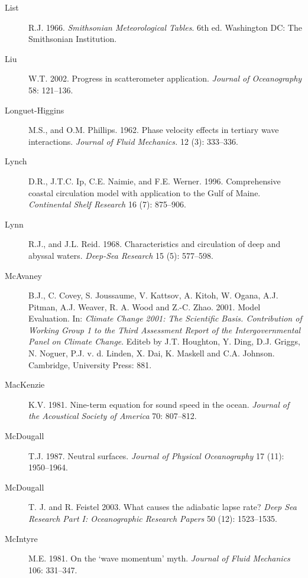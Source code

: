 \begin{description}
\item [List]R.J. 1966. \textit{Smithsonian Meteorological Tables}. 6th
  ed. Washington DC: The Smithsonian Institution.

\item [Liu]W.T. 2002. Progress in scatterometer
  application. \textit{Journal of Oceanography} 58: 121--136.

\item [Longuet-Higgins]M.S., and O.M. Phillips. 1962. Phase velocity
  effects in tertiary wave interactions. \textit{Journal of Fluid
    Mechanics.} 12 (3): 333--336.

\item [Lynch]D.R., J.T.C. Ip, C.E. Naimie, and
  F.E. Werner. 1996. Comprehensive coastal circulation model with
  application to the Gulf of Maine.  \textit{Continental Shelf
    Research} 16 (7): 875--906.

\item [Lynn]R.J., and J.L. Reid. 1968. Characteristics and circulation
  of deep and abyssal waters. \textit{Deep-Sea Research} 15 (5):
  577--598.

\item [McAvaney]B.J., C. Covey, S. Joussaume, V. Kattsov, A. Kitoh,
  W. Ogana, A.J. Pitman, A.J. Weaver, R. A. Wood and
  Z.-C. Zhao. 2001. Model Evaluation. In: \textit{Climate Change 2001:
    The Scientific Basis. Contribution of Working Group 1 to the Third
    Assessment Report of the Intergovernmental Panel on Climate
    Change}.  Editeb by J.T. Houghton, Y. Ding, D.J. Griggs,
  N. Noguer, P.J. v. d. Linden, X.  Dai, K. Maskell and
  C.A. Johnson. Cambridge, University Press: 881.

\item [MacKenzie]K.V. 1981. Nine-term equation for sound speed in the
  ocean.  \textit{Journal of the Acoustical Society of America} 70:
  807--812.

\item [McDougall]T.J. 1987. Neutral surfaces. \textit{Journal of
  Physical Oceanography} 17 (11): 1950--1964.

\item [McDougall]T. J. and R. Feistel 2003. What causes the adiabatic
  lapse rate? \textit{Deep Sea Research Part I: Oceanographic Research
    Papers} 50 (12): 1523--1535.

\item [McIntyre]M.E. 1981. On the `wave momentum'
  myth. \textit{Journal of Fluid Mechanics} 106: 331--347.


\end{description}

